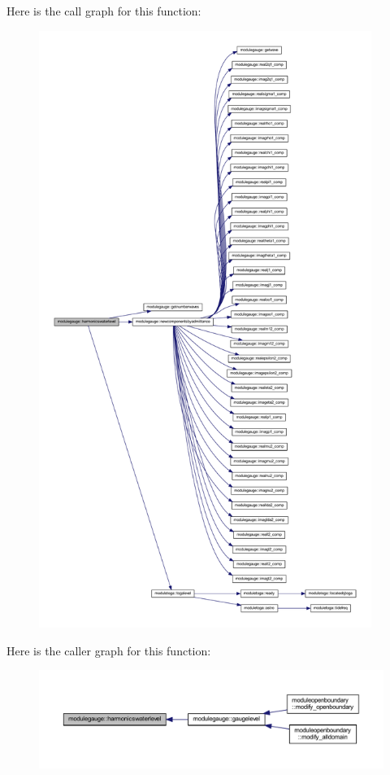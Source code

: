 Here is the call graph for this function\+:\nopagebreak
\begin{figure}[H]
\begin{center}
\leavevmode
\includegraphics[height=550pt]{namespacemodulegauge_a7de5a32e5ee02eaed3c8a598bbb65cb9_cgraph}
\end{center}
\end{figure}
Here is the caller graph for this function\+:\nopagebreak
\begin{figure}[H]
\begin{center}
\leavevmode
\includegraphics[width=350pt]{namespacemodulegauge_a7de5a32e5ee02eaed3c8a598bbb65cb9_icgraph}
\end{center}
\end{figure}
\mbox{\label{namespacemodulegauge_ab71fe2294ae9095789c94992c6add8bf}} 
